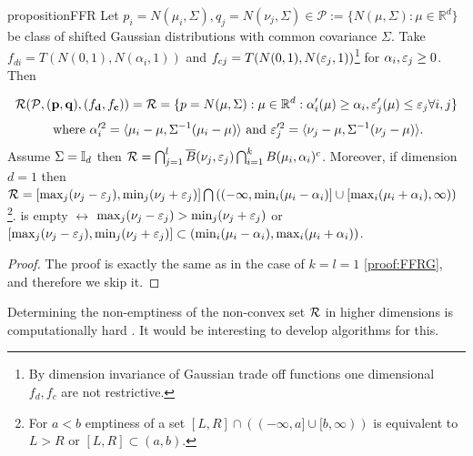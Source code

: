 \begin{restatable}{proposition}{FFR}
\label{thm:FFRkl}
Let $p_i = N(\mu_i, \Sigma), q_j= N(\nu_j, \Sigma)\in \mathcal{P}:= \{N(\mu, \Sigma): \mu \in \mathbb{R}^d\}$ be class of shifted Gaussian distributions with common covariance $\Sigma$. Take $f_{di}= T(N(0,1), N(\alpha_i, 1))$ and $f_{cj}= T(N(0,1), N(\varepsilon_j,1))$\footnote{By dimension invariance of Gaussian trade off functions one dimensional $f_d,f_c$ are not restrictive.} for $\alpha_i, \varepsilon_j \geq 0$. Then  

\begin{equation} \label{eq:GFRkl}
\mathcal{R}(\mathcal{P}, (\mathbf{p},\mathbf{q}), (f_\mathbf{d},f_\mathbf{c})) =
\mathcal{R}= \{p= N(\mu, \Sigma): \mu \in \mathbb{R}^d: \alpha_i'(\mu) \geq \alpha_i, \varepsilon_j'(\mu) \leq \varepsilon_j \forall i,j\} 
\end{equation}
\begin{equation} \label{eq:GFRparameters0kl}
\text{ where } \alpha_i'^2= \langle \mu_i -\mu, \Sigma^{-1}(\mu_i-\mu) \rangle \text{ and }\varepsilon_j'^2= \langle \nu_j -\mu, \Sigma^{-1}(\nu_j-\mu) \rangle. 
\end{equation}
 Assume $\Sigma=\mathbb{I}_d$ then $\mathcal{R} = \bigcap_{j=1}^l\overline{B}(\nu_j, \varepsilon_j) \bigcap_{i=1}^k B(\mu_i, \alpha_i)^c$. Moreover,  if dimension $d=1$ then $\mathcal{R}= [\max_{j} (\nu_j -\varepsilon_j), \min_{j} (\nu_j + \varepsilon_j)] \bigcap \left((-\infty, \min_{i}(\mu_i -\alpha_i)] \cup [ \max_{i} (\mu_i+\alpha_i), \infty)\right)$\footnote{For $a<b$  emptiness of a set $[L,R] \cap \left((-\infty, a] \cup [b, \infty)\right)$ is equivalent to $L>R$ or $[L,R] \subset (a,b)$.}.  is empty $\leftrightarrow$ $ \max_{j} (\nu_j -\varepsilon_j) > \min_{j} (\nu_j + \varepsilon_j)$ or $[\max_{j} (\nu_j -\varepsilon_j), \min_{j} (\nu_j + \varepsilon_j)] \subset (\min_{i}(\mu_i -\alpha_i), \max_{i} (\mu_i+\alpha_i))$.
\end{restatable}
\begin{proof}
    The proof is exactly the same as in the case of $k=l=1$ \ref{proof:FFRG}, and therefore we skip it.
\end{proof}
\begin{remark}
   Determining the non-emptiness of the non-convex set $\mathcal{R}$ in higher dimensions is computationally hard \cite{MurtyKabadi1987}. It would be interesting to develop algorithms for this.
\end{remark}
